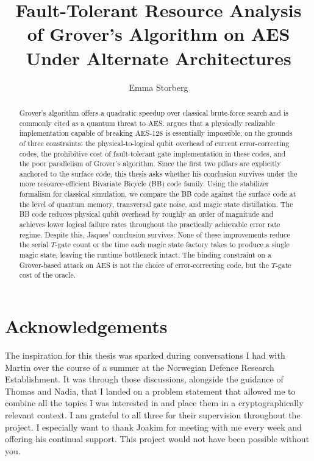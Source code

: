 \documentclass[USenglish]{uiomasterthesis}
\title{Fault-Tolerant Resource Analysis of Grover's Algorithm on AES Under Alternate Architectures}
\author{Emma Storberg}
\begin{document}
\uiomasterfp[
	dept={Department of Physics},
	program={Computational Science: Physics},
	supervisors={Martin Strand \and Joakim Bergli \and Thomas Gregersen \and Nadia Slavila Larsen},
	long
]

\frontmatter{}
\begin{abstract}
Grover's algorithm offers a quadratic speedup over classical brute-force search and is commonly cited as a quantum threat to AES. \textcite{jaques2024ches_presentation} argues that a physically realizable implementation capable of breaking AES-128 is essentially impossible, on the grounds of three constraints: the physical-to-logical qubit overhead of current error-correcting codes, the prohibitive cost of fault-tolerant gate implementation in these codes, and the poor parallelism of Grover's algorithm. Since the first two pillars are explicitly anchored to the surface code, this thesis asks whether his conclusion survives under the more resource-efficient Bivariate Bicycle (BB) code family. Using the stabilizer formalism for classical simulation, we compare the BB code against the surface code at the level of quantum memory, transversal gate noise, and magic state distillation. The BB code reduces physical qubit overhead by roughly an order of magnitude and achieves lower logical failure rates throughout the practically achievable error rate regime. Despite this, Jaques' conclusion survives: None of these improvements reduce the serial $T$-gate count or the time each magic state factory takes to produce a single magic state, leaving the runtime bottleneck intact. The binding constraint on a Grover-based attack on AES is not the choice of error-correcting code, but the $T$-gate cost of the oracle.
\end{abstract}

\chapter*{Acknowledgements}
The inspiration for this thesis was sparked during conversations I had with Martin over the course of a summer at the Norwegian Defence Research Establishment. It was through those discussions, alongside the guidance of Thomas and Nadia, that I landed on a problem statement that allowed me to combine all the topics I was interested in and place them in a cryptographically relevant context. I am grateful to all three for their supervision throughout the project.
I especially want to thank Joakim for meeting with me every week and offering his continual support. This project would not have been possible without you.
\end{document}
